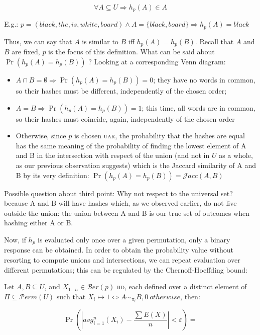 \documentclass{report}
\newcommand{\berdist}{\mathcal{B}er}
\newcommand{\iid}{\textsc{iid}}
\newcommand{\uar}{\textsc{uar}}
\newcommand{\jaccsim}{\mathcal{J}acc}
\newcommand{\coin}{\berdist}
\begin{document}
	\begin{equation}
	\forall A \subseteq U \Rightarrow h_p(A) \in A
	\end{equation}
	
	E.g.: $p = (black, the, is, white, board) \wedge A = \{black, board\} \Rightarrow h_p(A) = black$
	
	Thus, we can say that $A$ is similar to $B$ iff $h_p(A)=h_p(B)$. Recall that $A$ and $B$ are fixed, $p$ is the focus of this definition. What can be said about $\Pr(h_p(A)=h_p(B))$ ? Looking at a corresponding Venn diagram:
	
	\begin{itemize}
	\item $A \cap B = \emptyset \Rightarrow \Pr(h_p(A)=h_p(B)) = 0$; they have no words in common, so their hashes must be different, independently of the chosen order;
	\item $A = B \Rightarrow \Pr(h_p(A)=h_p(B)) = 1$; this time, all words are in common, so their hashes must coincide, again, independently of the chosen order
	\item Otherwise, since $p$ is chosen \uar, the probability that the hashes are equal has the same meaning of the probability of finding the lowest element of A and B in the intersection with respect of the union (and not in $U$ as a whole, as our previous observation suggests) which is the Jaccard similarity of A and B by its very definition: $\Pr(h_p(A)=h_p(B)) = \jaccsim(A, B)$
	\end{itemize}
	
	Possible question about third point: Why not respect to the universal set? because A and B will have hashes which, as we observed earlier, do not live outside the union: the union between A and B is our true set of outcomes when hashing either A or B.
	
	Now, if $h_p$ is evaluated only once over a given permutation, only a binary response can be obtained. In order to obtain the probability value without resorting to compute unions and intersections, we can repeat evaluation over different permutations; this can be regulated by the Chernoff-Hoeffding bound:
	
	Let $A, B \subseteq U$, and $X_{1 \dots n} \in \coin(p)$ \iid, each defined over a distinct element of $\Pi \subseteq \mathcal{P}erm(U)$ such that $X_i \mapsto 1 \Leftrightarrow A \sim_{\pi_i} B, 0\ otherwise$, then:
	
	\begin{equation}
	\displaystyle \Pr\left(\left|avg_{i=1}^{n}(X_i) - \frac{\sum E(X)}{n}\right|<\varepsilon\right) = 
	\end{equation}
	
\end{document}
